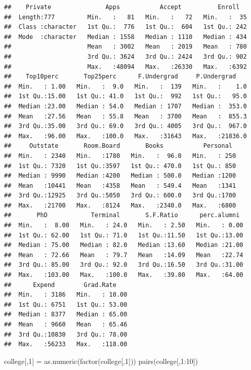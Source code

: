 \documentclass[
]{article}
\newenvironment{Shaded}{\begin{snugshade}}{\end{snugshade}}
\newcommand{\DecValTok}[1]{\textcolor[rgb]{0.00,0.00,0.81}{#1}}
\newcommand{\FunctionTok}[1]{\textcolor[rgb]{0.00,0.00,0.00}{#1}}
\newcommand{\NormalTok}[1]{#1}
\newcommand{\OtherTok}[1]{\textcolor[rgb]{0.56,0.35,0.01}{#1}}
\newcommand{\SpecialCharTok}[1]{\textcolor[rgb]{0.00,0.00,0.00}{#1}}
\begin{document}
\begin{verbatim}
##    Private               Apps           Accept          Enroll    
##  Length:777         Min.   :   81   Min.   :   72   Min.   :  35  
##  Class :character   1st Qu.:  776   1st Qu.:  604   1st Qu.: 242  
##  Mode  :character   Median : 1558   Median : 1110   Median : 434  
##                     Mean   : 3002   Mean   : 2019   Mean   : 780  
##                     3rd Qu.: 3624   3rd Qu.: 2424   3rd Qu.: 902  
##                     Max.   :48094   Max.   :26330   Max.   :6392  
##    Top10perc       Top25perc      F.Undergrad     P.Undergrad     
##  Min.   : 1.00   Min.   :  9.0   Min.   :  139   Min.   :    1.0  
##  1st Qu.:15.00   1st Qu.: 41.0   1st Qu.:  992   1st Qu.:   95.0  
##  Median :23.00   Median : 54.0   Median : 1707   Median :  353.0  
##  Mean   :27.56   Mean   : 55.8   Mean   : 3700   Mean   :  855.3  
##  3rd Qu.:35.00   3rd Qu.: 69.0   3rd Qu.: 4005   3rd Qu.:  967.0  
##  Max.   :96.00   Max.   :100.0   Max.   :31643   Max.   :21836.0  
##     Outstate       Room.Board       Books           Personal   
##  Min.   : 2340   Min.   :1780   Min.   :  96.0   Min.   : 250  
##  1st Qu.: 7320   1st Qu.:3597   1st Qu.: 470.0   1st Qu.: 850  
##  Median : 9990   Median :4200   Median : 500.0   Median :1200  
##  Mean   :10441   Mean   :4358   Mean   : 549.4   Mean   :1341  
##  3rd Qu.:12925   3rd Qu.:5050   3rd Qu.: 600.0   3rd Qu.:1700  
##  Max.   :21700   Max.   :8124   Max.   :2340.0   Max.   :6800  
##       PhD            Terminal       S.F.Ratio      perc.alumni   
##  Min.   :  8.00   Min.   : 24.0   Min.   : 2.50   Min.   : 0.00  
##  1st Qu.: 62.00   1st Qu.: 71.0   1st Qu.:11.50   1st Qu.:13.00  
##  Median : 75.00   Median : 82.0   Median :13.60   Median :21.00  
##  Mean   : 72.66   Mean   : 79.7   Mean   :14.09   Mean   :22.74  
##  3rd Qu.: 85.00   3rd Qu.: 92.0   3rd Qu.:16.50   3rd Qu.:31.00  
##  Max.   :103.00   Max.   :100.0   Max.   :39.80   Max.   :64.00  
##      Expend        Grad.Rate     
##  Min.   : 3186   Min.   : 10.00  
##  1st Qu.: 6751   1st Qu.: 53.00  
##  Median : 8377   Median : 65.00  
##  Mean   : 9660   Mean   : 65.46  
##  3rd Qu.:10830   3rd Qu.: 78.00  
##  Max.   :56233   Max.   :118.00
\end{verbatim}

\begin{Shaded}
\begin{Highlighting}[]
\NormalTok{college[,}\DecValTok{1}\NormalTok{] }\OtherTok{=} \FunctionTok{as.numeric}\NormalTok{(}\FunctionTok{factor}\NormalTok{(college[,}\DecValTok{1}\NormalTok{]))}
\FunctionTok{pairs}\NormalTok{(college[,}\DecValTok{1}\SpecialCharTok{:}\DecValTok{10}\NormalTok{])}
\end{Highlighting}
\end{Shaded}
\end{document}
